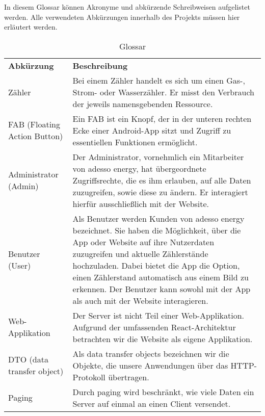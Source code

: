 \begin{tcolorbox}
In diesem Glossar können Akronyme und abkürzende Schreibweisen aufgelistet werden. 
Alle verwendeten Abkürzungen innerhalb des Projekts müssen hier erläutert werden.
\end{tcolorbox}

\begin{table}[h]
	\centering
	\begin{tabularx}{\textwidth}{X X}
		\rowcolor[HTML]{C0C0C0} 
		\textbf{Abkürzung} & \textbf{Beschreibung} \\
		Zähler & Bei einem Zähler handelt es sich um einen Gas-, Strom- oder Wasserzähler. Er misst den Verbrauch der jeweils namensgebenden Ressource. \\
		\rowcolor[HTML]{E7E7E7} 
		FAB (Floating Action Button) & Ein FAB ist ein Knopf, der in der unteren rechten Ecke einer Android-App sitzt und Zugriff zu essentiellen Funktionen ermöglicht. \\
		Administrator (Admin) & Der Administrator, vornehmlich ein Mitarbeiter von adesso energy, hat übergeordnete Zugriffsrechte, die es ihm erlauben, auf alle Daten zuzugreifen, sowie diese zu ändern. Er interagiert hierfür ausschließlich mit der Website. \\
		\rowcolor[HTML]{E7E7E7} 
		Benutzer (User) & Als Benutzer werden Kunden von adesso energy bezeichnet. Sie haben die Möglichkeit, über die App oder Website auf ihre Nutzerdaten zuzugreifen und aktuelle Zählerstände hochzuladen. Dabei bietet die App die Option, einen Zählerstand automatisch aus einem Bild zu erkennen. Der Benutzer kann sowohl mit der App als auch mit der Website interagieren. \\
		Web-Applikation & Der Server ist nicht Teil einer Web-Applikation. Aufgrund der umfassenden React-Architektur betrachten wir die Website als eigene Applikation. \\
		\rowcolor[HTML]{E7E7E7} 
		DTO (data transfer object) & Als data transfer objects bezeichnen wir die Objekte, die unsere Anwendungen über das HTTP-Protokoll übertragen. \\
		Paging & Durch paging  wird beschränkt, wie viele Daten ein Server auf einmal an einen Client versendet. 
	\end{tabularx}
	\caption{Glossar}
	\label{table:glossar}
\end{table}